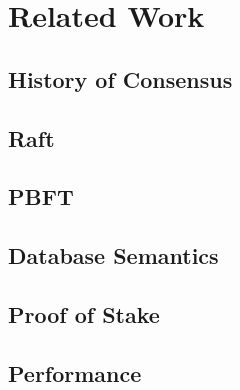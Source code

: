 \chapter{Related Work}

\section{History of Consensus}

\section{Raft}

\section{PBFT}

\section{Database Semantics}

\section{Proof of Stake}

\section{Performance}
